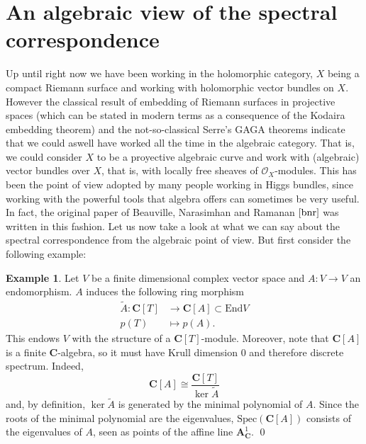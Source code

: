 \documentclass[12pt,a4paper]{book}
\theoremstyle{definition} \newtheorem{defn}[thm]{Definition}
\theoremstyle{definition} \newtheorem{ejemplo}[thm]{Example}
\theoremstyle{remark} \newtheorem{rem}[thm]{Remark}
\def\OO{\mathscr{O}}
\def\CC{\mathbf{C}}
\def\End{\mathrm{End}}
\def\Spec{\mathrm{Spec}}
\begin{document}
	      \section{An algebraic view of the spectral correspondence}
	      Up until right now we have been working in the holomorphic category, $X$ being a compact Riemann surface and working with holomorphic vector bundles on $X$. However the classical result of embedding of Riemann surfaces in projective spaces (which can be stated in modern terms as a consequence of the Kodaira embedding theorem) and the not-so-classical Serre's GAGA theorems indicate that we could aswell have worked all the time in the algebraic category. That is, we could consider $X$ to be a proyective algebraic curve and work with (algebraic) vector bundles over $X$, that is, with locally free sheaves of $\OO_X$-modules. This has been the point of view adopted by many people working in Higgs bundles, since working with the powerful tools that algebra offers can sometimes be very useful. In fact, the original paper of Beauville, Narasimhan and Ramanan $\cite{bnr}$ was written in this fashion. Let us now take a look at what we can say about the spectral correspondence from the algebraic point of view. But first consider the following example:
	      \begin{ejemplo}
		Let $V$ be a finite dimensional complex vector space and $A:V\rightarrow V$ an endomorphism. $A$ induces the following ring morphism
		\begin{align*}
		  \tilde{A} :\CC[T]&\longrightarrow \CC[A]\subset \End V\\ 
		    p(T) &\longmapsto p(A). 
		  \end{align*}
		  This endows $V$ with the structure of a $\CC[T]$-module. Moreover, note that $\CC[A]$ is a finite $\CC$-algebra, so it must have Krull dimension $0$ and therefore discrete spectrum. Indeed, 
		  \begin{equation*}
		    \CC[A] \cong \frac{\CC[T]}{\ker \tilde{A}}
		  \end{equation*}
		  and, by definition, $\ker \tilde{A}$ is generated by the minimal polynomial of $A$. Since the roots of the minimal polynomial are the eigenvalues, $\Spec(\CC[A])$ consists of the eigenvalues of $A$, seen as points of the affine line $\mathbf{A}^1_\CC$.
		\qed
	      \end{ejemplo}
\end{document}
